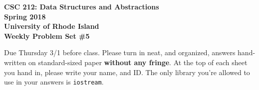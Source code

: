 \documentclass[11pt]{article}
\begin{document}
    \thispagestyle{empty}
    
    \begin{center}
        {\Large\bf CSC 212: Data Structures and Abstractions}\\
        \medskip
        {\Large\bf Spring 2018}\\
        \medskip
        {\Large\bf University of Rhode Island}\\
        \bigskip
        {\Large\bf Weekly Problem Set \#5}
    \end{center}
    
    Due Thursday 3/1 before class. Please turn in neat, and organized, answers hand-written on standard-sized paper \textbf{without any fringe}. At the top of each sheet you hand in, please write your name, and ID.
    The only library you're allowed to use in your answers is \verb|iostream|.
    
\end{document}
